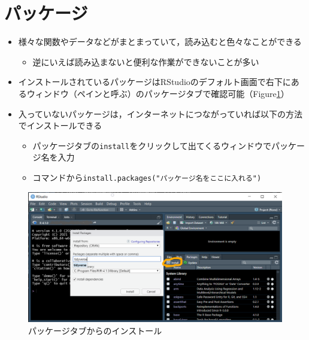 \documentclass[
  xelatex,ja=standard, b5paper]{bxjsbook}
\providecommand{\tightlist}{%
  \setlength{\itemsep}{0pt}\setlength{\parskip}{0pt}}
\begin{document}
\hypertarget{p-package}{%
\section{パッケージ}\label{p-package}}

\begin{itemize}
\tightlist
\item
  様々な関数やデータなどがまとまっていて，読み込むと色々なことができる

  \begin{itemize}
  \tightlist
  \item
    逆にいえば読み込まないと便利な作業ができないことが多い
  \end{itemize}
\item
  インストールされているパッケージはRStudioのデフォルト画面で右下にあるウィンドウ（ペインと呼ぶ）のパッケージタブで確認可能（Figure\ref{fig:pinst}）\\
\item
  入っていないパッケージは，インターネットにつながっていれば以下の方法でインストールできる

  \begin{itemize}
  \tightlist
  \item
    パッケージタブの\texttt{install}をクリックして出てくるウィンドウでパッケージ名を入力
  \item
    コマンドから\texttt{install.packages("パッケージ名をここに入れる")}
  \end{itemize}
\end{itemize}

\begin{figure}

{\centering \includegraphics[width=0.8\linewidth]{images/package_install} 

}

\caption{パッケージタブからのインストール}\label{fig:pinst}
\end{figure}
\end{document}
